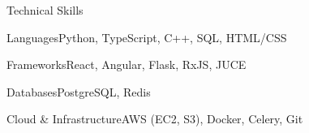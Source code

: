 \documentclass[
	11pt
]{../../../template}
\begin{document}
	\begin{rSection}{T}{echnical Skills}
		\begin{rSet}{Languages}{Python, TypeScript, C++, SQL, HTML/CSS}
		\end{rSet}
		\begin{rSet}{Frameworks}{React, Angular, Flask, RxJS, JUCE}
		\end{rSet}
		\begin{rSet}{Databases}{PostgreSQL, Redis}
		\end{rSet}
		\begin{rSet}{Cloud \& Infrastructure}{AWS (EC2, S3), Docker, Celery, Git}
		\end{rSet}
	\end{rSection}
\end{document}
